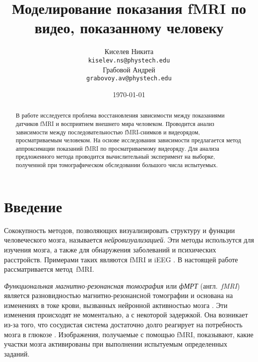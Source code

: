 \documentclass[a4paper, 12pt]{article}
\title{Моделирование показания fMRI по видео, показанному человеку}
\author{
	Киселев Никита \\
	\texttt{kiselev.ns@phystech.edu} \\
	\And
	Грабовой Андрей \\
	\texttt{grabovoy.av@phystech.edu}
}
\date{\today}
\begin{document}
\maketitle

\begin{abstract}
	
	В работе исследуется проблема восстановления зависимости между показаниями датчиков fMRI
	и восприятием внешнего мира человеком.
	Проводится анализ зависимости между последовательностью fMRI-снимков и видеорядом,
	просматриваемым человеком.
	На основе исследования зависимости предлагается метод аппроксимации показаний fMRI по
	просматриваемому видеоряду.
	Для анализа предложенного метода проводится вычислительный эксперимент на 
	выборке, полученной при томографическом обследовании большого числа испытуемых.

\end{abstract}



\section{Введение}

	Сококупность методов, позволяющих визуализировать структуру и функции человеческого мозга,
	называется \textit{нейровизуализацией}. Эти методы использутся для изучения мозга, а также
	для обнаружения заболеваний и психических расстройств. 
	Примерами таких являются fMRI и iEEG \citep{Berezutskaya2022}.
	В настоящей работе рассматривается метод~fMRI.

	\textit{Функциональная магнитно-резонансная томография} или \textit{фМРТ} (англ.~\textit{fMRI}) 
	является разновидностью магнитно-резонансной томографии и основана на изменениях в токе крови, 
	вызванных нейронной активностью мозга \citep{Glover2011}. 
	Эти изменения происходят не моментально, а с некоторой задержкой.
	Она возникает из-за того, что сосудистая система достаточно долго реагирует 
	на потребность мозга в глюкозе \citep{Logothetis2003}. Изображения, получаемые с помощью fMRI,
	показывают, какие участки мозга активированы при выполнении испытуемым определенных заданий.
\end{document}
